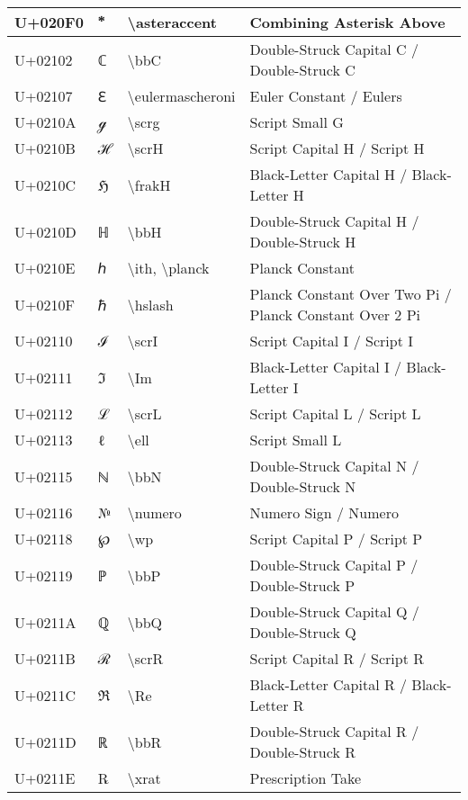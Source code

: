 \begin{table}[h]
\begin{tabulary}{\linewidth}{|L|L|L|L|}
\hline
U+020F0 &  ⃰  & {\textbackslash}asteraccent & Combining Asterisk Above \\
\hline
U+02102 & ℂ & {\textbackslash}bbC & Double-Struck Capital C / Double-Struck C \\
\hline
U+02107 & ℇ & {\textbackslash}eulermascheroni & Euler Constant / Eulers \\
\hline
U+0210A & ℊ & {\textbackslash}scrg & Script Small G \\
\hline
U+0210B & ℋ & {\textbackslash}scrH & Script Capital H / Script H \\
\hline
U+0210C & ℌ & {\textbackslash}frakH & Black-Letter Capital H / Black-Letter H \\
\hline
U+0210D & ℍ & {\textbackslash}bbH & Double-Struck Capital H / Double-Struck H \\
\hline
U+0210E & ℎ & {\textbackslash}ith, {\textbackslash}planck & Planck Constant \\
\hline
U+0210F & ℏ & {\textbackslash}hslash & Planck Constant Over Two Pi / Planck Constant Over 2 Pi \\
\hline
U+02110 & ℐ & {\textbackslash}scrI & Script Capital I / Script I \\
\hline
U+02111 & ℑ & {\textbackslash}Im & Black-Letter Capital I / Black-Letter I \\
\hline
U+02112 & ℒ & {\textbackslash}scrL & Script Capital L / Script L \\
\hline
U+02113 & ℓ & {\textbackslash}ell & Script Small L \\
\hline
U+02115 & ℕ & {\textbackslash}bbN & Double-Struck Capital N / Double-Struck N \\
\hline
U+02116 & № & {\textbackslash}numero & Numero Sign / Numero \\
\hline
U+02118 & ℘ & {\textbackslash}wp & Script Capital P / Script P \\
\hline
U+02119 & ℙ & {\textbackslash}bbP & Double-Struck Capital P / Double-Struck P \\
\hline
U+0211A & ℚ & {\textbackslash}bbQ & Double-Struck Capital Q / Double-Struck Q \\
\hline
U+0211B & ℛ & {\textbackslash}scrR & Script Capital R / Script R \\
\hline
U+0211C & ℜ & {\textbackslash}Re & Black-Letter Capital R / Black-Letter R \\
\hline
U+0211D & ℝ & {\textbackslash}bbR & Double-Struck Capital R / Double-Struck R \\
\hline
U+0211E & ℞ & {\textbackslash}xrat & Prescription Take \\

\end{tabulary}
\end{table}
